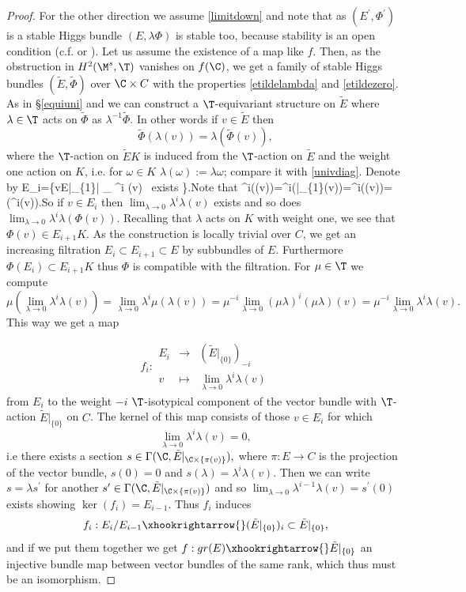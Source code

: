 \begin{proof}
	For the other direction we assume \eqref{limitdown} and note that as $(E^\prime,\Phi^\prime)$ is a stable Higgs bundle $(E,\lambda\Phi)$ is stable too, because stability is an open condition (c.f. \cite[Lemma 3.7]{simpson1} or \cite[Proposition 3.1]{nitsure}).
	Let us assume the existence of a map like $f$. Then, as the obstruction in $H^2(\M^s,\T)$ vanishes on $f(\C)$, we get a family of stable Higgs bundles $(\tilde{E},\tilde{\Phi})$ over $\C\times C$ with the properties \eqref{etildelambda} and \eqref{etildezero}. As in \S\ref{equiuni} and \cite[\S 4]{hausel-thaddeus} we can construct a $\T$-equivariant structure on $\tilde{E}$ where $\lambda\in \T$ acts on $\tilde{\Phi}$ as $\lambda^{-1}\tilde{\Phi}$. In other words if $v\in \tilde{E}$ then $$\tilde{\Phi}(\lambda(v))=\lambda(\tilde{\Phi}(v)),$$ where the $\T$-action on $\tilde{E}K$ is induced from the $\T$-action on $\tilde{E}$ and the weight  one action on $K$, i.e. for $\omega\in K$ $\lambda(\omega):=\lambda \omega$; compare it with \eqref{univdiag}. Denote by \beq \label{filtdef}E_i=\{v\in E\cong {}|_{\{1\}}| \lim_{\lambda{}} \lambda^i \lambda(v)  \mbox{ exists} \}.\eeq Note that \beq\label{limphi}\lambda^i\lambda(\Phi(v))=\lambda^i\lambda(\tilde{\Phi}|_{\{1\}}(v))=\lambda^i\tilde{\Phi}(\lambda(v))=\tilde{\Phi}(\lambda^i\lambda(v)).\eeq So if $v\in E_i$ then $\lim_{\lambda\to 0}\lambda^i\lambda(v)$ exists and so does $\lim_{\lambda\to 0}\lambda^i\lambda(\Phi(v))$. Recalling that $\lambda$ acts on $K$ with weight one, we see that $\Phi(v)\in E_{i+1}K$.  As the construction is locally trivial over $C$, we get an increasing filtration $E_i\subset E_{i+1}\subset E$ by subbundles of $E$. Furthermore $\Phi(E_i)\subset E_{i+1}K$ thus $\Phi$ is compatible with the filtration. For $\mu\in \T$ we compute $$\mu(\lim_{\lambda\to 0}\lambda^i\lambda(v)) =\lim_{\lambda\to 0}\lambda^i\mu(\lambda(v))=\mu^{-i}\lim_{\lambda\to 0}(\mu\lambda)^i(\mu\lambda)(v)=\mu^{-i}\lim_{\lambda\to 0}\lambda^i\lambda(v).$$ This way we get a map

	 $$f_i:\begin{array}{ccc}E_i&\to &(\tilde{E}|_{\{0\}})_{-i}\\ v &\mapsto& \lim_{\lambda\to 0} \lambda^{i}\lambda(v) \end{array}$$ from $E_i$ to the weight $-i$ $\T$-isotypical component of the vector bundle with $\T$-action $\tilde{E}|_{\{0\}}$ on $C$. The kernel of this map consists of those $v\in E_i$ for which $$ \lim_{\lambda\to 0}\lambda^i\lambda(v)=0,$$ i.e  there exists a section  $s\in \Gamma(\C,\tilde{E}|_{\C\times \{\pi(v)\}}),$ where $\pi:E\to C$ is the projection of the vector bundle,  $s(0)=0$ and $s(\lambda)=\lambda^i\lambda(v)$. Then we can write $s=\lambda s^\prime$ for another $s^\prime\in \Gamma(\C,\tilde{E}|_{\C\times \{\pi(v)\}})$ and so $ \lim_{\lambda\to 0}\lambda^{i-1}\lambda(v)=s^\prime(0)$ exists showing $\ker(f_i)=E_{i-1}$. Thus $f_i$ induces $$f_i:E_i/E_{i-1}\xhookrightarrow{} (\tilde{E}|_{\{0\}})_i\subset \tilde{E}|_{\{0\}}, $$ and if we put them together we get $f:gr(E)\xhookrightarrow{} \tilde{E}|_{\{0\}}$ an injective bundle map between  vector bundles of the same rank, which thus must be an isomorphism.


\end{proof}
